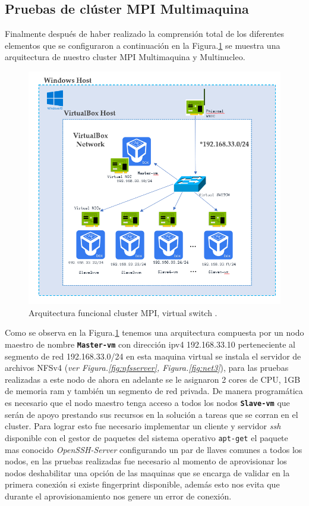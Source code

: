 \documentclass[letterpaper, 12pt, oneside]{article}
\begin{document}
    \subsection{Pruebas de clúster MPI Multimaquina}
    Finalmente después de haber realizado la comprensión total de los diferentes elementos que se configuraron a continuación en la Figura.\ref{fig:clus0} se muestra una arquitectura de nuestro cluster MPI Multimaquina y Multinucleo.
    \begin{figure}[H]\centering
            \includegraphics[scale=1.2]{img/cluster/cluster1.png}
            \caption{Arquitectura funcional cluster MPI, virtual switch .}
            \label{fig:clus0}
    \end{figure}
    Como se observa en la Figura.\ref{fig:clus0} tenemos una arquitectura compuesta por un nodo maestro de nombre \textbf{\texttt{Master-vm}} con dirección ipv4 192.168.33.10 perteneciente al segmento de red 192.168.33.0/24 en esta maquina virtual se instala el servidor de archivos NFSv4 (\textit{ver Figura.\ref{fig:nfsserver}, Figura.\ref{fig:net3}}), para las pruebas realizadas a este nodo de ahora en adelante se le asignaron 2 cores de CPU, 1GB de memoria ram y también un segmento de red privada. De manera programática es necesario que el nodo maestro tenga acceso a todos los nodos \textbf{\texttt{Slave-vm}} que serán de apoyo prestando sus recursos en la solución a tareas que se corran en el cluster. Para lograr esto fue necesario implementar un cliente y servidor \textit{ssh} disponible con el gestor de paquetes del sistema operativo \texttt{apt-get} el paquete mas conocido \textit{OpenSSH-Server} configurando un par de llaves comunes a todos los nodos, en las pruebas realizadas fue necesario al momento de aprovisionar los nodos deshabilitar una opción de las maquinas que se encarga de validar en la primera conexión si existe fingerprint disponible, además esto nos evita que durante el aprovisionamiento nos genere un error de conexión.
\end{document}
